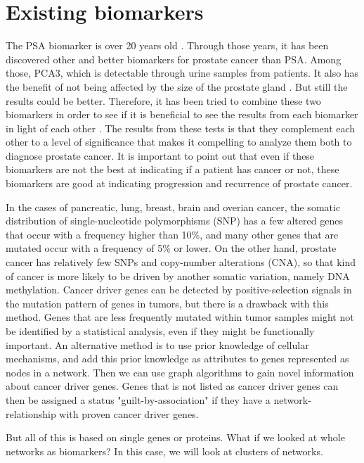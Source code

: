 \section{Existing biomarkers}
The PSA biomarker is over 20 years old \cite{psa-age}. Through those years, it
has been discovered other and better biomarkers for prostate cancer than PSA.
Among those, PCA3, which is detectable through urine samples from patients. It
also has the benefit of not being affected by the size of the prostate gland
\cite{pca3-size}. But still the results could be better. Therefore, it has been
tried to combine these two biomarkers in order to see if it is beneficial to see
the results from each biomarker in light of each other \cite{beyondpsa}. The
results from these tests is that they complement each other to a level of
significance that makes it compelling to analyze them both to diagnose prostate
cancer. It is important to point out that even if these biomarkers are not the
best at indicating if a patient has cancer or not, these biomarkers are good at
indicating progression and recurrence of prostate cancer.

In the cases of pancreatic, lung, breast, brain and overian cancer, the somatic
distribution of single-nucleotide polymorphisms (SNP) has a few altered genes
that occur with a frequency higher than 10\%, and many other genes that are
mutated occur with a frequency of 5\% or lower\cite{pathway-network}. On the
other hand, prostate cancer has relatively few SNPs and copy-number alterations
(CNA), so that kind of cancer is more likely to be driven by another somatic
variation, namely DNA methylation. Cancer driver genes can be detected by
positive-selection signals in the mutation pattern of genes in tumors, but there
is a drawback with this method. Genes that are less frequently mutated within
tumor samples might not be identified by a statistical analysis, even if they
might be functionally important. An alternative method is to use prior knowledge
of cellular mechanisms, and add this prior knowledge as attributes to genes
represented as nodes in a network. Then we can use graph algorithms to gain
novel information about cancer driver genes. Genes that is not listed as cancer
driver genes can then be assigned a status "guilt-by-association" if they have a
network-relationship with proven cancer driver genes.

But all of this is based on single genes or proteins. What if we looked at whole
networks as biomarkers? In this case, we will look at clusters of networks.

